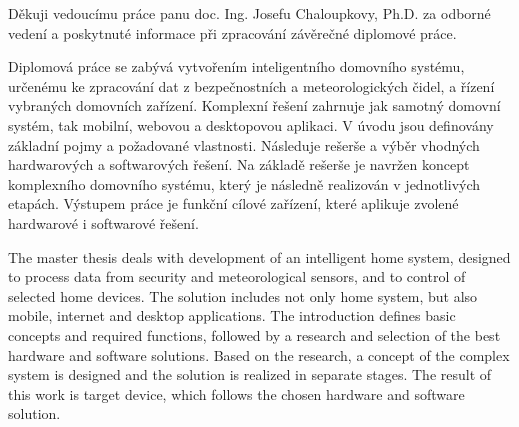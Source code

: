\documentclass[FM,DP]{tulthesis}  %
\begin{document}


\begin{acknowledgement}
Děkuji vedoucímu práce panu doc. Ing. Josefu Chaloupkovy, Ph.D. za odborné vedení a poskytnuté informace při zpracování závěrečné diplomové práce.
\end{acknowledgement}


\begin{abstractCZ}
Diplomová práce se zabývá vytvořením inteligentního domovního systému, určenému ke zpracování dat z bezpečnostních a meteorologických čidel, a řízení vybraných domovních zařízení. Komplexní řešení zahrnuje jak samotný domovní systém, tak mobilní, webovou a desktopovou aplikaci. V úvodu jsou definovány základní pojmy a požadované vlastnosti. Následuje rešerše a výběr vhodných hardwarových a softwarových řešení. Na základě rešerše je navržen koncept komplexního domovního systému, který je následně realizován v jednotlivých etapách. Výstupem práce je funkční cílové zařízení, které aplikuje zvolené hardwarové i softwarové řešení.
\end{abstractCZ}

\vspace{2cm}

\begin{abstractEN}
The master thesis deals with development of an intelligent home system, designed to process data from security and meteorological sensors, and to control of selected home devices. The solution includes not only home system, but also mobile, internet and desktop applications. The introduction defines basic concepts and required functions, followed by a research and selection of the best hardware and software solutions. Based on the research, a concept of the complex system is designed and the solution is realized in separate stages. The result of this work is target device, which follows the chosen hardware and software solution.
\end{abstractEN}


\tableofcontents
\clearpage
\end{document}
